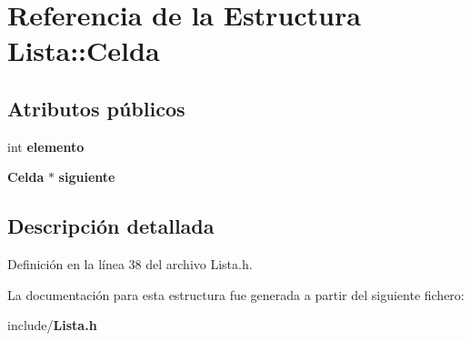 \section{Referencia de la Estructura Lista\-:\-:Celda}
\label{structLista_1_1Celda}
\subsection*{Atributos públicos}
\begin{DoxyCompactItemize}
\item 
int {\bfseries elemento}\label{structLista_1_1Celda_a88ff43dabe8b196a5103d770163ac277}

\item 
{\bf Celda} $\ast$ {\bfseries siguiente}\label{structLista_1_1Celda_ac6b93477f9e33731947c802bce988572}

\end{DoxyCompactItemize}


\subsection{Descripción detallada}


Definición en la línea 38 del archivo Lista.\-h.



La documentación para esta estructura fue generada a partir del siguiente fichero\-:\begin{DoxyCompactItemize}
\item 
include/{\bf Lista.\-h}\end{DoxyCompactItemize}
